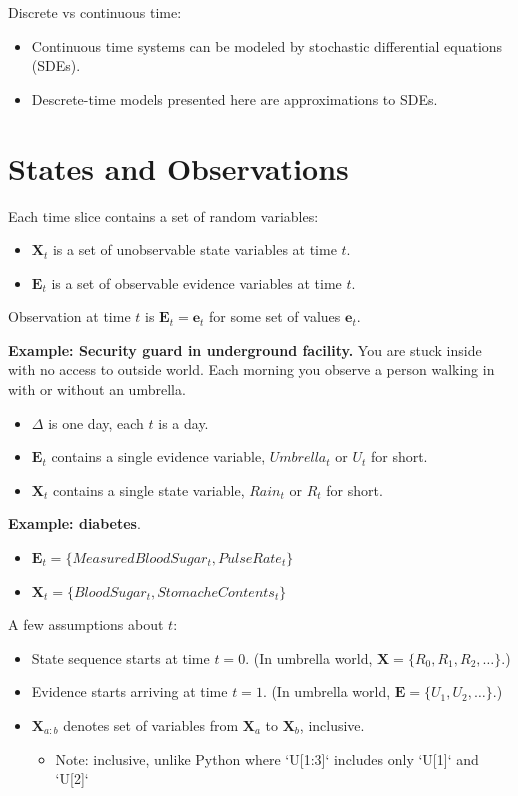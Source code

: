 \documentclass[11pt]{article}
\begin{document}
Discrete vs continuous time:

\begin{itemize}
\item Continuous time systems can be modeled by stochastic differential equations (SDEs).
\item Descrete-time models presented here are approximations to SDEs.
\end{itemize}
\section{States and Observations}
\label{sec:org80b404e}

Each time slice contains a set of random variables:

\begin{itemize}
\item \(\bm{X}_t\) is a set of unobservable state variables at time \(t\).
\item \(\bm{E}_t\) is a set of observable evidence variables at time \(t\).
\end{itemize}

Observation at time \(t\) is \(\bm{E}_t = \bm{e}_t\) for some set of values \(\bm{e}_t\).

\textbf{Example: Security guard in underground facility.}  You are stuck inside with no access to outside world.  Each morning you observe a person walking in with or without an umbrella.

\begin{itemize}
\item \(\Delta\) is one day, each \(t\) is a day.
\item \(\bm{E}_t\) contains a single evidence variable, \(Umbrella_t\) or \(U_t\) for short.
\item \(\bm{X}_t\) contains a single state variable, \(Rain_t\) or \(R_t\) for short.
\end{itemize}

\textbf{Example: diabetes}.

\begin{itemize}
\item \(\bm{E}_t = \{ MeasuredBloodSugar_t, PulseRate_t \}\)
\item \(\bm{X}_t = \{ BloodSugar_t, StomacheContents_t \}\)
\end{itemize}

A few assumptions about \(t\):

\begin{itemize}
\item State sequence starts at time \(t = 0\). (In umbrella world, \(\bm{X} = \{R_0, R_1, R_2, \dots \}\).)
\item Evidence starts arriving at time \(t = 1\). (In umbrella world, \(\bm{E} = \{U_1, U_2, \dots \}\).)
\item \(\bm{X}_{a:b}\) denotes set of variables from \(\bm{X}_a\) to \(\bm{X}_b\), inclusive.

\begin{itemize}
\item Note: inclusive, unlike Python where `U[1:3]` includes only `U[1]` and `U[2]`
\end{itemize}
\end{itemize}
\end{document}
